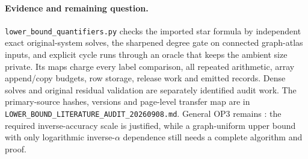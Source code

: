 \paragraph{Evidence and remaining question.}
\texttt{lower\_bound\_quantifiers.py} checks the imported star formula
by independent exact original-system solves, the sharpened degree gate
on connected graph-atlas inputs, and explicit cycle runs through an
oracle that keeps the ambient size private. Its maps charge every label
comparison, all repeated arithmetic, array append/copy budgets, row
storage, release work and emitted records. Dense solves and original
residual validation are separately identified audit work.
The primary-source hashes, versions and page-level transfer map are in
\texttt{LOWER\_BOUND\_LITERATURE\_AUDIT\_20260908.md}.
General OP3 remains \statusopen: the required inverse-accuracy scale is
justified, while a graph-uniform upper bound with only logarithmic
inverse-$\alpha$ dependence still needs a complete algorithm and proof.
